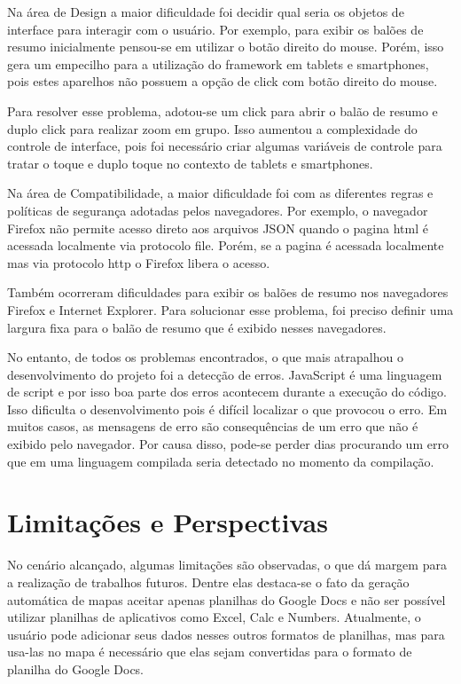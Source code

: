 Na área de Design a maior dificuldade foi decidir qual seria os objetos de interface para interagir com o usuário. Por exemplo, para exibir os balões de resumo inicialmente pensou-se em utilizar o botão direito do mouse. Porém, isso gera um empecilho para a utilização do framework em tablets e smartphones, pois estes aparelhos não possuem a opção de click com botão direito do mouse. 

Para resolver esse problema, adotou-se um click para abrir o balão de resumo e duplo click para realizar zoom em grupo. Isso aumentou a complexidade do controle de interface, pois foi necessário criar algumas variáveis de controle para tratar o toque e duplo toque no contexto de tablets e smartphones.

Na área de Compatibilidade, a maior dificuldade foi com as diferentes regras e políticas de segurança adotadas pelos navegadores. Por exemplo, o navegador Firefox não permite acesso direto aos arquivos JSON quando o pagina html é acessada localmente via protocolo file. Porém, se a pagina é acessada localmente mas via protocolo http o Firefox libera o acesso. 

Também ocorreram dificuldades para exibir os balões de resumo nos navegadores Firefox e Internet Explorer. Para solucionar esse problema, foi preciso definir uma largura fixa para o balão de resumo que é exibido nesses navegadores.
 
No entanto, de todos os problemas encontrados, o que mais atrapalhou o desenvolvimento do projeto foi a detecção de erros. JavaScript é uma linguagem de script  e por isso boa parte dos erros acontecem durante a execução do código. Isso dificulta o desenvolvimento pois é difícil localizar o que provocou o erro. Em muitos casos, as mensagens de erro são consequências de um erro que não é exibido pelo navegador. Por causa disso, pode-se perder dias procurando um erro que em uma linguagem compilada seria detectado no momento da compilação.


\section{Limitações e Perspectivas}


No cenário alcançado, algumas limitações são observadas, o que dá margem para a realização de trabalhos futuros. Dentre elas destaca-se o fato da geração automática de mapas aceitar apenas planilhas do Google Docs e não ser possível utilizar planilhas de aplicativos como Excel, Calc e Numbers. Atualmente, o usuário pode adicionar seus dados nesses outros formatos de planilhas, mas para usa-las no mapa  é necessário que elas sejam convertidas para  o formato de planilha do Google Docs.

